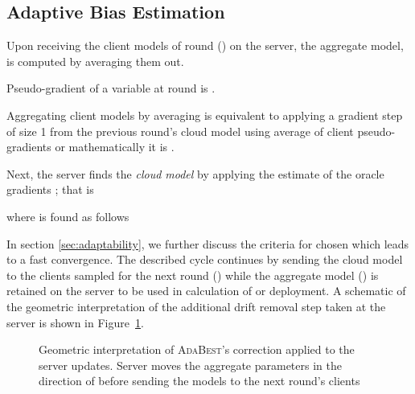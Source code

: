 \documentclass[runningheads]{llncs}
\def\figref#1{Figure~\ref{#1}}
\newcommand{\ours}{\textsc{AdaBest}\xspace}
\begin{document}
\subsection{Adaptive Bias Estimation} 
Upon receiving the client models of round  () on the server, the {aggregate model},  is computed by averaging them out. 

{ Pseudo-gradient of a variable  at round  is .} 

\begin{remark}
\label{re:aggregate}
Aggregating client models by averaging is equivalent to applying a gradient step of size 1 from the previous round's cloud model using average of client pseudo-gradients or mathematically it is .
\end{remark}



\noindent Next, the server finds the \emph{cloud model}  by applying the estimate of the oracle gradients ; that is 

where  is found as follows

In section \ref{sec:adaptability}, we further discuss the criteria for chosen  which leads to a fast convergence.
The described cycle continues by sending the cloud model to the clients sampled for the next round () while the aggregate model () is retained on the server to be used in calculation of  or deployment.
A schematic of the geometric interpretation of the additional drift removal step taken at the server is shown in \figref{fig:geometric_int}.
\begin{figure}
\centering
{}
\caption{Geometric interpretation of \ours's correction applied to the server updates. Server moves the aggregate parameters in the direction of  before sending the models to the next round's clients}
\label{fig:geometric_int}
\end{figure}
\end{document}
